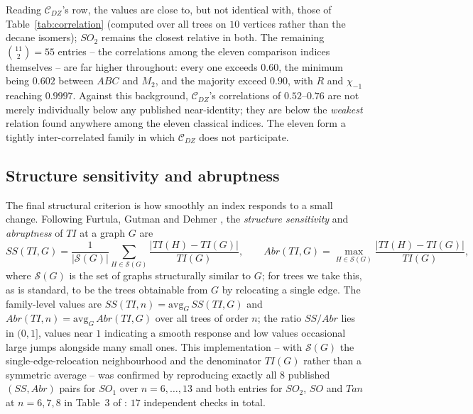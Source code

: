 \documentclass[11pt,a4paper]{article}
\theoremstyle{plain}
\theoremstyle{definition}
\theoremstyle{remark}
\newcommand{\CDZ}{\mathcal{C}_{DZ}}
\begin{document}
Reading $\CDZ$'s row, the values are close to, but not identical with, those of
Table~\ref{tab:correlation} (computed over all trees on $10$ vertices rather than
the decane isomers); $SO_2$ remains the closest relative in both. The remaining
$\binom{11}2=55$ entries -- the correlations among the eleven comparison indices
themselves -- are far higher throughout: every one exceeds $0.60$, the minimum
being $0.602$ between $ABC$ and $M_2$, and the majority exceed $0.90$, with $R$
and $\chi_{-1}$ reaching $0.9997$. Against this background, $\CDZ$'s correlations
of $0.52$--$0.76$ are not merely individually below any published near-identity;
they are below the \emph{weakest} relation found anywhere among the eleven
classical indices. The eleven form a tightly inter-correlated family in which
$\CDZ$ does not participate.

\subsection{Structure sensitivity and abruptness}
\label{sec:ssabr}

The final structural criterion is how smoothly an index responds to a small
change. Following Furtula, Gutman and Dehmer \cite{furtula2013}, the
\emph{structure sensitivity} and \emph{abruptness} of $TI$ at a graph $G$ are
\[
  SS(TI,G)=\frac1{|\mathcal S(G)|}\sum_{H\in\mathcal S(G)}
           \frac{|TI(H)-TI(G)|}{TI(G)},
  \qquad
  Abr(TI,G)=\max_{H\in\mathcal S(G)}\frac{|TI(H)-TI(G)|}{TI(G)},
\]
where $\mathcal S(G)$ is the set of graphs structurally similar to $G$; for trees
we take this, as is standard, to be the trees obtainable from $G$ by relocating a
single edge. The family-level values are
$SS(TI,n)=\mathrm{avg}_G\,SS(TI,G)$ and $Abr(TI,n)=\mathrm{avg}_G\,Abr(TI,G)$
over all trees of order $n$; the ratio $SS/Abr$ lies in $(0,1]$, values near $1$
indicating a smooth response and low values occasional large jumps alongside many
small ones. This implementation -- with $\mathcal S(G)$ the single-edge-relocation
neighbourhood and the denominator $TI(G)$ rather than a symmetric average -- was
confirmed by reproducing exactly all $8$ published $(SS,Abr)$ pairs for $SO_1$
over $n=6,\dots,13$ and both entries for $SO_2$, $SO$ and $Tan$ at $n=6,7,8$ in
Table~3 of \cite{oz2025}: $17$ independent checks in total.
\end{document}
